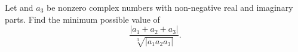 Let   and $a_3$ be nonzero complex numbers with non-negative real and imaginary parts.  Find the minimum possible value of \[\dfrac{|a_1+a_2+a_3|}{\sqrt[3]{|a_1a_2a_3|}}.\]